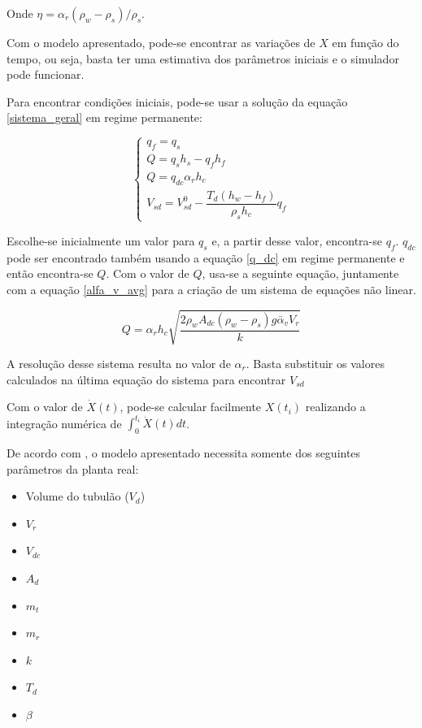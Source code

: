 Onde $\eta = \alpha_r (\rho_w - \rho_s)/\rho_s$.

Com o modelo apresentado, pode-se encontrar as variações de $X$ em
função do tempo, ou seja, basta ter uma estimativa dos parâmetros
iniciais e o simulador pode funcionar.

Para encontrar condições iniciais, pode-se usar a solução da equação
\ref{sistema_geral} em regime permanente:

\begin{equation}
  \begin{cases}
    q_f = q_s \\
    Q = q_s h_s - q_f h_f \\
    Q = q_{dc} \alpha_r h_c \\
    V_{sd} = V_{sd}^0 - \dfrac{T_d(h_w-h_f)}{\rho_s h_c} q_f
  \end{cases}
  \label{sistema_geral_rp}
\end{equation}

Escolhe-se inicialmente um valor para $q_s$ e, a partir desse valor,
encontra-se $q_f$. $q_{dc}$ pode ser encontrado também usando a
equação \ref{q_dc} em regime permanente e então encontra-se $Q$. Com o
valor de $Q$, usa-se a seguinte equação,  juntamente com a equação
\ref{alfa_v_avg} para a criação de um sistema de equações não linear.

\begin{equation}
  Q=\alpha_r h_c \sqrt{\dfrac{2 \rho_w A_{dc} (\rho_w - \rho_s) g
      \bar{\alpha}_v V_r}{k}} 
  \label{Q_lin_sys}
\end{equation}

A resolução desse sistema resulta no valor de $\alpha_r$. Basta
substituir os valores calculados na última equação do sistema para
encontrar $V_{sd}$

Com o valor de $\dot{X}(t)$, pode-se calcular facilmente $X(t_i)$
realizando a integração numérica de $ \int_0^{t_i} \dot{X}(t) dt $.
  
De acordo com , o modelo apresentado necessita
somente dos seguintes parâmetros da planta real:

\begin{itemize}
\item Volume do tubulão ($ V_d $)
\item $ V_r $
\item $ V_{dc} $
\item $ A_d $
\item $ m_t $
\item $ m_r $
\item $ k $
\item $ T_d $
\item $ \beta $
\end{itemize}

